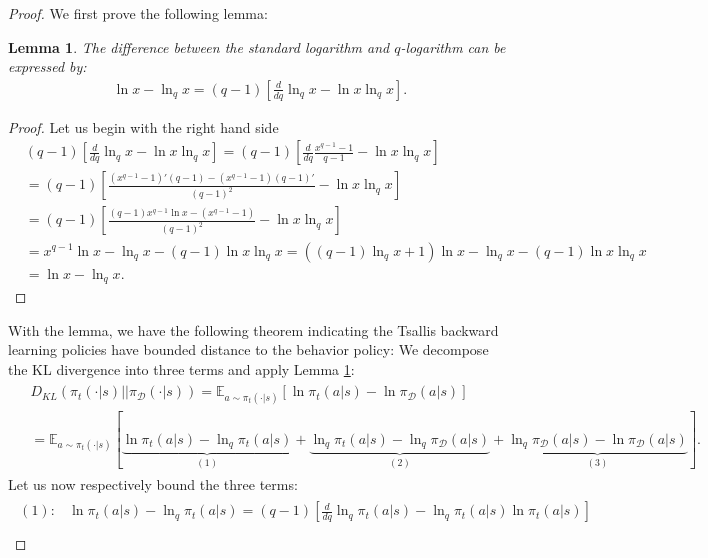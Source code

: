 \documentclass{article}
\newtheorem{lemma}{Lemma}
\newcommand{\AdaBracket}[1]{\left(#1\right)}
\newcommand{\AdaRectBracket}[1]{\left[#1\right]}
\newcommand{\expectation}[2]{\mathbb{E}_{#1}\AdaRectBracket{#2}}
\newcommand{\KLany}[2]{D_{\!K\!L}\!\left(#1 \left|  \right| #2 \right)}
\newcommand{\datasetPolicy}{\pi_{\mathcal{D}}}
\begin{document}
\begin{proof}
    We first prove the following lemma:
\begin{lemma}\label{lemma:log_qlog_diff}
    The difference between the standard logarithm and $q$-logarithm can be expressed by:
    \begin{align*}
        \ln x - \ln_q x = (q-1) \AdaRectBracket{\frac{d}{dq}\ln_q x - \ln x \ln_q x}.
    \end{align*}
\end{lemma}
\begin{proof}
    Let us begin with the right hand side 
    \begin{align*}
        &(q-1) \AdaRectBracket{\frac{d}{dq}\ln_q x - \ln x \ln_q x} = (q-1) \AdaRectBracket{\frac{d}{dq} \frac{x^{q-1} - 1}{q-1} -  \ln x \ln_q x}\\
        &= (q-1) \AdaRectBracket{ \frac{(x^{q-1} - 1)'(q-1) - (x^{q-1} - 1)(q-1)'}{(q-1)^2  } -  \ln x \ln_q x }\\
        &= (q-1) \AdaRectBracket{ \frac{(q-1) x^{q-1}\ln x - (x^{q-1} - 1)}{(q-1)^2  } -  \ln x \ln_q x }\\
        &= x^{q-1}\ln x - \ln_q x - (q-1)\ln x\ln_q x = \AdaBracket{(q-1)\ln_q x + 1} \ln x - \ln_q x - (q-1)\ln x\ln_q x\\
        &= \ln x - \ln_q x.
    \end{align*}
\end{proof}
With the lemma, we have the following theorem indicating the Tsallis backward learning  policies have bounded distance to the behavior policy:
    We decompose the KL divergence into three terms and apply Lemma \ref{lemma:log_qlog_diff}:
\begin{align}
    \begin{split}
        &\KLany{\pi_t(\cdot|s)}{\datasetPolicy(\cdot|s)} = \expectation{a\sim\pi_{t}(\cdot | s)}{\ln \pi_{t}(a|s) - \ln\datasetPolicy(a|s)} \\
        & = \expectation{a\sim\pi_{t}(\cdot | s)}{\underbrace{\ln \pi_{t}(a|s) - \ln_q\pi_{t}(a|s)}_{(1)} + \underbrace{\ln_q\pi_{t}(a|s) -  \ln_q\datasetPolicy(a|s)}_{(2)} + \underbrace{\ln_q\datasetPolicy(a|s) - \ln\datasetPolicy(a|s)}_{(3)} } .
    \end{split}
\end{align}
Let us now respectively bound the three terms:
\begin{align}
    \begin{split}
        (1): &\ln \pi_{t}(a|s) - \ln_q\pi_{t}(a|s) = (q-1) \AdaRectBracket{\frac{d}{dq}\ln_q \pi_t(a|s) - \ln_q\pi_t(a|s)\ln\pi_t(a|s)}\\

\end{split}
\end{align}
\end{proof}
\end{document}

